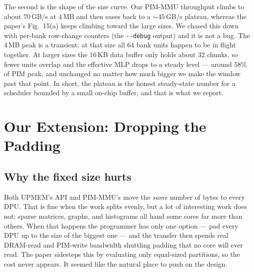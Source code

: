 \documentclass[conference]{IEEEtran}
\begin{document}
The second is the shape of the size curve. Our PIM-MMU throughput climbs to
about $70$\,GB/s at $4$\,MB and then eases back to a $\sim$$45$\,GB/s plateau,
whereas the paper's Fig.~15(a) keeps climbing toward the large sizes. We chased
this down with per-bank row-change counters (the \texttt{-{}-debug} output) and
it is not a bug. The $4$\,MB peak is a transient: at that size all $64$ bank
units happen to be in flight together. At larger sizes the $16$\,KB data buffer
only holds about $32$ chunks, so fewer units overlap and the effective MLP
drops to a steady level --- around $58\%$ of PIM peak, and unchanged no matter
how much bigger we make the window past that point. In short, the plateau is the
honest steady-state number for a scheduler bounded by a small on-chip buffer,
and that is what we report.

\section{Our Extension: Dropping the Padding}
\subsection{Why the fixed size hurts}
Both UPMEM's API and PIM-MMU's move the \emph{same} number of bytes to every
DPU. That is fine when the work splits evenly, but a lot of interesting work does
not: sparse matrices, graphs, and histograms all hand some cores far more than
others. When that happens the programmer has only one option --- pad every DPU up
to the size of the biggest one --- and the transfer then spends real DRAM-read
and PIM-write bandwidth shuttling padding that no core will ever read. The paper
sidesteps this by evaluating only equal-sized partitions, so the cost never
appears. It seemed like the natural place to push on the design.
\end{document}
